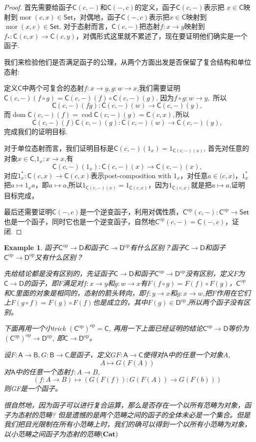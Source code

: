 \documentclass{article}
\newtheorem{example}[theorem]{Example}
\newcommand*{\cat}[1]{\textsf{#1}\xspace}
\newcommand{\Set}{\textsf{Set}\xspace}
\newcommand{\sC}{\mathsf{C}}
\newcommand{\sD}{\mathsf{D}}
\newcommand{\op}{\textrm{op}}
\newcommand*{\xfunc}[4]{{#2}\colon{#3}{#1}{#4}}
\newcommand*{\func}[3]{\xfunc{\to}{#1}{#2}{#3}}
\DeclareMathOperator{\mor}{mor}
\DeclareMathOperator{\dom}{dom}
\DeclareMathOperator{\cod}{cod}
\begin{document}
\begin{proof}
首先需要给函子$\cat{C}(c,-)$和$\cat{C}(-,c)$的定义，函子$\cat{C}(c,-)$表示把
$x \in \cat{C}$映射到$\mor(c,x) \in \cat{Set}$，对偶地，函子$\cat{C}(-,c)$表示把$x \in \cat{C}$映射到$\mor(x,c) \in \cat{Set}$. 对于态射而言，$\cat{C}(c,-)$把态射$\func{f}{x}{y}$映射到$\func{f_*}{\cat{C}(c,x)}{\cat{C}(c,y)}$，对偶形式这里就不累述了，现在要证明他们确实是一个函子. 

我们来检验他们是否满足函子的公理，从两个方面出发是否保留了复合结构和单位态射:

定义$\cat{C}$中两个可复合的态射$\func{f}{x}{y},\func{g}{w}{x}$,我们需要证明$\cat{C}(c,-)(f \circ g)=\cat{C}(c,-)(f) \circ \cat{C}(c,-)(g)$. 因为$\func{f \circ g}{w}{y},$ 所以\[\func{\cat{C}(c,-)(fg)}{\cat{C}(c,-)(w)}{\cat{C}(c,-)(y)},\]而$\dom\cat{C}(c,-)(f)=\cod\cat{C}(c,-)(g)=\cat{C}(c,x),$所以\[\func{\cat{C}(c,-)(f)\cat{C}(c,-)(g)}{\cat{C}(c,-)(w)}{\cat{C}(c,-)(y)},\]完成我们的证明目标.

对于单位态射而言，我们证明目标是$\cat{C}(c,-)(1_x)=1_{\cat{C}(c,-)(x)}$, 首先对任意的对象$x\in\cat{C}$,$\func{1_x}{x}{x}$,有\[\func{\cat{C}(c,-)(1_x)}{\cat{C}(c,-)(x)}{\cat{C}(c,-)(x)},\]对应$\func{1^{*}_{x}}{\cat{C}(c,x)}{\cat{C}(c,x)}$表示post-composition with $1_x$，对任意$a\in\cat(c,x)$，$1^{*}_{x}$把$a\mapsto 1_xa$，即$a \mapsto a$,所以$1_{\cat{C}(c,-)(x)} = 1_{\cat{C}(c,x)}$，因为$1_{\cat{C}(c,x)}$就是把$a \mapsto a$,证明目标完成，

最后还需要证明$\cat{C}(-,c)$是一个逆变函子，利用对偶性质，$\func{\cat{C}^\op(c,-)}{\cat{C}^\op}{\Set}$也是一个函子，同时它也是一个逆变函子，自然地$\cat{C}^\op(c,-) = \cat{C}(-,c)$，证闭. 
\end{proof}

\begin{example}
\rm 函子$\sC^{\op}\to \sD$和函子$\sC\to \sD^{\op}$有什么区别？函子$\sC\to\sD$和函子$\sC^{\op}\to \sD^{\op}$又有什么区别？

先给结论都是没有区别的，先证函子$\sC\to\sD$和函子$\sC^{\op}\to \sD^{\op}$没有区别，定义$F$为$\sC\to\sD$的函子，即$F$满足对$\func{f}{x}{y}$和$\func{g}{w}{x}$有$F(f \circ g)=F(f) \circ F(g)$，$\sC^{\op}$和$\sC$里面的对象是相同的，态射的箭头转向，即$\func{f}{y}{x}$和$\func{g}{x}{w}$,把$F$作用在它们上$F(g \circ f)=F(g) \circ F(f)$也是成立的，其中$F(g) \in \sD^{\op}$,所以两个函子没有区别。

下面再用一个小trick $({\sC^{\op}})^{\op}=\sC$, 再用一下上面已经证明的结论$\sC^{\op}\to\sD$等价为$({\sC^{\op}})^{\op}\to\sD^{\op}$, 即$\sC\to\sD^{\op}$。

设$F \colon \cat{A} \rightarrow \cat{B},G \colon \cat{B} \rightarrow \cat{C}$是函子，定义$GF \colon \cat{A} \rightarrow \cat{C}$使得对$\cat{A}$中的任意一个对象$A$,\[A \mapsto G(F(A))\]
对$\cat{A}$中的任意一个态射$f \colon A \rightarrow B$, \[(f \colon A \rightarrow B) \mapsto (G(F(f)) \colon G(F(A)) \rightarrow G(F(b))) \]则GF是一个函子。

很自然地，因为函子可以进行复合运算，那么是否存在一个以所有范畴为对象，函子为态射的范畴? 但是遗憾的是两个范畴之间的函子的全体未必是一个集合。但是我们把目光限制在所有小范畴上时，我们的确可以得到一个以所有小范畴为对象，以小范畴之间函子为态射的范畴$\bf(Cat)$

\end{example}
\end{document}
